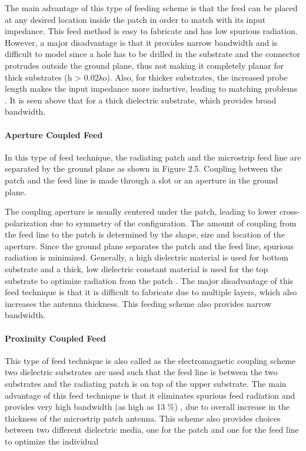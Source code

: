 \documentclass[12pt]{article}
\begin{document}
					                  The main advantage of this type of feeding scheme is that the feed can be placed at any desired location inside the patch in order to match with its input impedance. This feed method is easy to fabricate and has low spurious radiation. However, a major disadvantage is that it provides narrow bandwidth and is difficult to model since a hole has to be drilled in the substrate and the connector protrudes outside the ground plane, thus not making it completely planar for thick substrates (h > 0.02λo). Also, for thicker substrates, the increased probe length makes the input impedance more inductive, leading to matching problems . It is seen above that for a thick dielectric substrate, which provides broad bandwidth.
					                \paragraph{Aperture Coupled Feed}
					                 \justify
					                  In this type of feed technique, the radiating patch and the microstrip feed line are separated by the ground plane as shown in Figure 2.5. Coupling between the patch and the feed line is made through a slot or an aperture in the ground plane.
					                  
					                  The coupling aperture is usually centered under the patch, leading to lower cross-polarization due to symmetry of the configuration. The amount of coupling from the feed line to the patch is determined by the shape, size and location of the aperture. Since the ground plane separates the patch and the feed line, spurious radiation is minimized. Generally, a high dielectric material is used for bottom substrate and a thick, low dielectric constant material is used for the top substrate to optimize radiation from the patch . The major disadvantage of this feed technique is that it is difficult to fabricate due to multiple layers, which also increases the antenna thickness. This feeding scheme also provides narrow bandwidth.
					                  
					                 \paragraph{ Proximity Coupled Feed}
					                  \justify
					                   This type of feed technique is also called as the electromagnetic coupling scheme two dielectric substrates are used such that the feed line is between the two substrates and the radiating patch is on top of the upper substrate. The main advantage of this feed technique is that it eliminates spurious feed radiation and provides very high bandwidth (as high as 13 \%) , due to overall increase in the thickness of the microstrip patch antenna. This scheme also provides choices between two different dielectric media, one for the patch and one for the feed line to optimize the individual 
\end{document}
